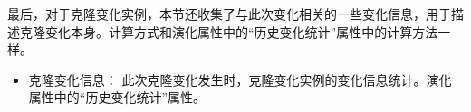 最后，对于克隆变化实例，本节还收集了与此次变化相关的一些变化信息，用于描述克隆变化本身。计算方式和演化属性中的“历史变化统计”属性中的计算方法一样。

\begin {itemize}
\item
克隆变化信息：
此次克隆变化发生时，克隆变化实例的变化信息统计。演化属性中的“历史变化统计”属性。
\end {itemize}


